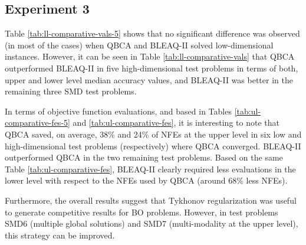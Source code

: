 \documentclass[conference]{IEEEtran}
\theoremstyle{definition}
\begin{document}
\subsection{Experiment 3}
Table \ref{tab:ll-comparative-vals-5} shows that no significant difference was
observed (in most of the cases) when QBCA and BLEAQ-II solved low-dimensional
instances. However, it can be seen in Table \ref{tab:ll-comparative-vals} that QBCA
outperformed BLEAQ-II in five high-dimensional test problems in terms of both,
upper and lower level median accuracy values, and BLEAQ-II was better in the remaining
three SMD test problems. 

In terms of objective function evaluations, and based in Tables \ref{tab:ul-comparative-fes-5}
and \ref{tab:ul-comparative-fes}, it is interesting to note that QBCA saved, on
average, 38\% and 24\% of NFEs at the upper level in six low and high-dimensional
test problems (respectively) where QBCA converged. BLEAQ-II outperformed QBCA in
the two remaining test problems. Based on the same Table \ref{tab:ul-comparative-fes},
BLEAQ-II clearly required less evaluations in the lower level with respect to the
NFEs used by QBCA (around 68\% less NFEs). 

Furthermore, the overall results suggest that Tykhonov regularization was useful
to generate competitive results for BO problems. However, in test problems SMD6
(multiple global solutions) and SMD7 (multi-modality at the upper level), this
strategy can be improved.


\end{document}
